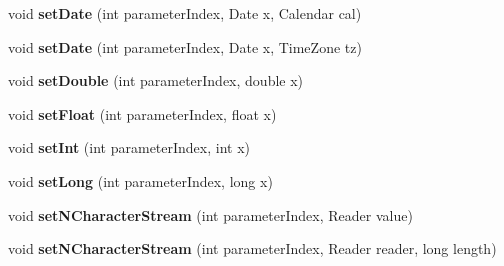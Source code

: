 \begin{DoxyCompactItemize}
void {\bfseries set\+Date} (int parameter\+Index, Date x, Calendar cal)
\item 
\mbox{\label{classcom_1_1mysql_1_1cj_1_1_server_prepared_query_bindings_a67bfe576432c4dca3e132e13178c5b54}} 
void {\bfseries set\+Date} (int parameter\+Index, Date x, Time\+Zone tz)
\item 
\mbox{\label{classcom_1_1mysql_1_1cj_1_1_server_prepared_query_bindings_a3e91d4ab9f8e4188780d9bf16e1773ad}} 
void {\bfseries set\+Double} (int parameter\+Index, double x)
\item 
\mbox{\label{classcom_1_1mysql_1_1cj_1_1_server_prepared_query_bindings_aeea814ec8fc7531c133a4acfcda7b013}} 
void {\bfseries set\+Float} (int parameter\+Index, float x)
\item 
\mbox{\label{classcom_1_1mysql_1_1cj_1_1_server_prepared_query_bindings_ad6bd01513aca9fc76b1e7e476ca4e9b2}} 
void {\bfseries set\+Int} (int parameter\+Index, int x)
\item 
\mbox{\label{classcom_1_1mysql_1_1cj_1_1_server_prepared_query_bindings_a44be4a4c225e130dbedba40929d0b6c3}} 
void {\bfseries set\+Long} (int parameter\+Index, long x)
\item 
\mbox{\label{classcom_1_1mysql_1_1cj_1_1_server_prepared_query_bindings_aad5346da528491502560f4fcc5ef0192}} 
void {\bfseries set\+N\+Character\+Stream} (int parameter\+Index, Reader value)
\item 
\mbox{\label{classcom_1_1mysql_1_1cj_1_1_server_prepared_query_bindings_a55138ad85c98d697e5e6df738e1876a5}} 
void {\bfseries set\+N\+Character\+Stream} (int parameter\+Index, Reader reader, long length)
\item 
\mbox{\label{classcom_1_1mysql_1_1cj_1_1_server_prepared_query_bindings_a0ed6559f381bdb4253c9f37d78ced0f3}} 

\end{DoxyCompactItemize}

